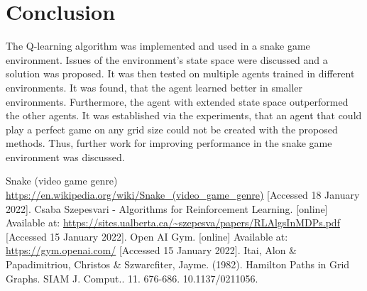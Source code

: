 \documentclass[lettersize,journal]{IEEEtran}
\begin{document}
\section{Conclusion}
The Q-learning algorithm was implemented and used in a snake game
environment. Issues of the environment's state space were discussed
and a solution was proposed. It was then tested on multiple agents
trained in different environments. It was found, that the agent
learned better in smaller environments. Furthermore, the agent
with extended state space outperformed the other agents.
It was established via the experiments, that an agent that could play a perfect
game on any grid size could not be created with the proposed methods.
Thus, further work for improving performance in the snake game environment was discussed.

\begin{thebibliography}{1}
    Snake (video game genre) \url{https://en.wikipedia.org/wiki/Snake_(video_game_genre)} [Accessed 18 January 2022].
    Csaba Szepesvari - Algorithms for Reinforcement Learning. [online] Available at: \url{https://sites.ualberta.ca/~szepesva/papers/RLAlgsInMDPs.pdf} [Accessed 15 January 2022].
    Open AI Gym. [online] Available at: \url{https://gym.openai.com/} [Accessed 15 January 2022].
Itai, Alon \& Papadimitriou, Christos \& Szwarcfiter, Jayme. (1982). Hamilton Paths in Grid Graphs. SIAM J. Comput.. 11. 676-686. 10.1137/0211056.
\end{thebibliography}
\end{document}

